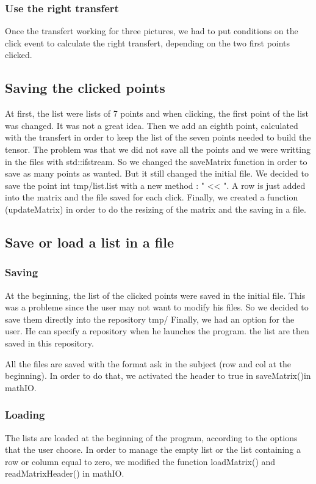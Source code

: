 \documentclass{report}
\begin{document}
\subsubsection{Use the right transfert}
Once the transfert working for three pictures, we had to put conditions on the click event to calculate the right transfert, depending on the two first points clicked.  

 
\subsection{Saving the clicked points}
At first, the list were lists of 7 points and when clicking, the first point of the list was changed. It was not a great idea. 
Then we add an eighth point, calculated with the transfert in order to keep the list of the seven points needed to build the tensor. The problem was that we did not save all the points and we were writting in the files with std::ifstream. So we changed the saveMatrix function in order to save as many points as wanted. But it still changed the initial file. 
We decided to save the point int tmp/list.list with a new method : " << ". A row is just added into the matrix and the file saved for each click. 
Finally, we created a function (updateMatrix) in order to do the resizing of the matrix and the saving in a file. 

\subsection{Save or load a list in a file}
\subsubsection{Saving}
At the beginning, the list of the clicked points were saved in the initial file. This was a probleme since the user may not want to modify his files. 
So we decided to save them directly into the repository tmp/ 
Finally, we had an option for the user. He can specify a repository when he launches the program. the list are then saved in this repository. 

All the files are saved with the format ask in the subject (row and col at the beginning). In order to do that, we activated the header to true in saveMatrix()in mathIO. 

\subsubsection{Loading}
The lists are loaded at the beginning of the program, according to the options that the user choose. In order to manage the empty list or the list containing a row or column equal to zero, we modified the function loadMatrix() and readMatrixHeader() in mathIO. 
\end{document}
